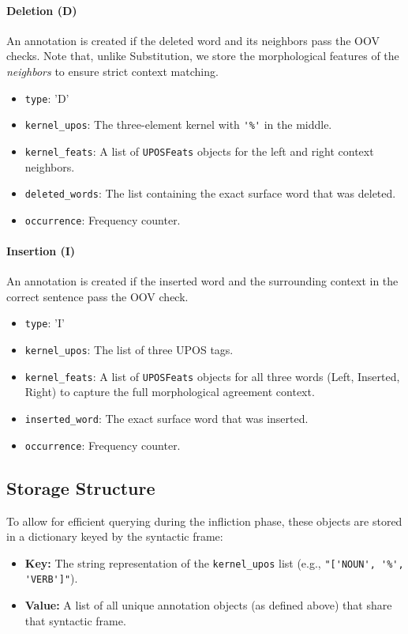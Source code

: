 \documentclass[11pt]{article}
\begin{document}
\begin{appendices}
\paragraph{Deletion (D)}
An annotation is created if the deleted word and its neighbors pass the OOV checks. Note that, unlike Substitution, we store the morphological features of the \textit{neighbors} to ensure strict context matching.
\begin{itemize}
\setlength{\itemsep}{0pt}
\setlength{\parskip}{0pt}
    \item \verb|type|: 'D'
    \item \verb|kernel_upos|: The three-element kernel with \verb|'%'| in the middle.
    \item \verb|kernel_feats|: A list of \verb|UPOSFeats| objects for the left and right context neighbors.
    \item \verb|deleted_words|: The list containing the exact surface word that was deleted.
    \item \verb|occurrence|: Frequency counter.
\end{itemize}

\paragraph{Insertion (I)}
An annotation is created if the inserted word and the surrounding context in the correct sentence pass the OOV check.
\begin{itemize}
\setlength{\itemsep}{0pt}
\setlength{\parskip}{0pt}
    \item \verb|type|: 'I'
    \item \verb|kernel_upos|: The list of three UPOS tags.
    \item \verb|kernel_feats|: A list of \verb|UPOSFeats| objects for all three words (Left, Inserted, Right) to capture the full morphological agreement context.
    \item \verb|inserted_word|: The exact surface word that was inserted.
    \item \verb|occurrence|: Frequency counter.
\end{itemize}

\subsection{Storage Structure}
To allow for efficient querying during the infliction phase, these objects are stored in a dictionary keyed by the syntactic frame:
\begin{itemize}
    \item \textbf{Key:} The string representation of the \verb|kernel_upos| list (e.g., \verb|"['NOUN', '%', 'VERB']"|).
    \item \textbf{Value:} A list of all unique annotation objects (as defined above) that share that syntactic frame.
\end{itemize}


\end{appendices}
\end{document}
